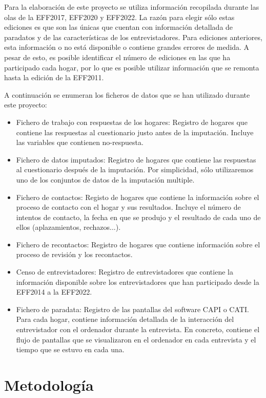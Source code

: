 Para la elaboración de este proyecto se utiliza información recopilada durante las olas de la EFF2017, EFF2020 y EFF2022. La razón para elegir sólo estas ediciones es que son las únicas que cuentan con información detallada de paradatos y de las características de los entrevistadores. Para ediciones anteriores, esta información o no está disponible o contiene grandes errores de medida. A pesar de esto, es posible identificar el número de ediciones en las que ha participado cada hogar, por lo que es posible utilizar información que se remonta hasta la edición de la EFF2011.

A continuación se enumeran los ficheros de datos que se han utilizado durante este proyecto:

\begin{itemize}
    \item Fichero de trabajo con respuestas de los hogares: Registro de hogares que contiene las respuestas al cuestionario justo antes de la imputación. Incluye las variables que contienen no-respuesta.
    \item Fichero de datos imputados: Registro de hogares que contiene las respuestas al cuestionario después de la imputación. Por simplicidad, sólo utilizaremos uno de los conjuntos de datos de la imputación multiple.
    \item Fichero de contactos: Registo de hogares que contiene la información sobre el proceso de contacto con el hogar y sus resultados. Incluye el número de intentos de contacto, la fecha en que se produjo y el resultado de cada uno de ellos (aplazamientos, rechazos...).
    \item Fichero de recontactos: Registro de hogares que contiene información sobre el proceso de revisión y los recontactos.
    \item Censo de entrevistadores: Registro de entrevistadores que contiene la información disponible sobre los entrevistadores que han participado desde la EFF2014 a la EFF2022.
    \item Fichero de paradata: Registro de las pantallas del software CAPI o CATI. Para cada hogar, contiene información detallada de la interacción del entrevistador con el ordenador durante la entrevista. En concreto, contiene el flujo de pantallas que se visualizaron en el ordenador en cada entrevista y el tiempo que se estuvo en cada una.
\end{itemize}

\section{Metodología}


